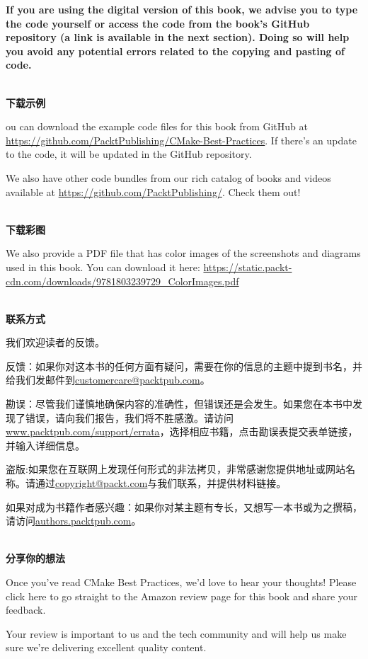 \textbf{If you are using the digital version of this book, we advise you to type the code yourself or access the code from the book's GitHub repository (a link is available in the next section). Doing so will help you avoid any potential errors related to the copying and pasting of code.}

\hspace*{\fill} \\ %
\textbf{下载示例}

ou can download the example code files for this book from GitHub at \url{https://github.com/PacktPublishing/CMake-Best-Practices}. If there's an update to the code, it will be updated in the GitHub repository.

We also have other code bundles from our rich catalog of books and videos available at \url{https://github.com/PacktPublishing/}. Check them out!

\hspace*{\fill} \\ %
\textbf{下载彩图}

We also provide a PDF file that has color images of the screenshots and diagrams used in this book. You can download it here: \url{https://static.packt-cdn.com/downloads/9781803239729_ColorImages.pdf}

\hspace*{\fill} \\ %
\textbf{联系方式}

我们欢迎读者的反馈。

反馈：如果你对这本书的任何方面有疑问，需要在你的信息的主题中提到书名，并给我们发邮件到\url{customercare@packtpub.com}。

勘误：尽管我们谨慎地确保内容的准确性，但错误还是会发生。如果您在本书中发现了错误，请向我们报告，我们将不胜感激。请访问\url{www.packtpub.com/support/errata}，选择相应书籍，点击勘误表提交表单链接，并输入详细信息。

盗版:如果您在互联网上发现任何形式的非法拷贝，非常感谢您提供地址或网站名称。请通过\url{copyright@packt.com}与我们联系，并提供材料链接。

如果对成为书籍作者感兴趣：如果你对某主题有专长，又想写一本书或为之撰稿，请访问\url{authors.packtpub.com}。

\hspace*{\fill} \\ %
\textbf{分享你的想法}

Once you've read CMake Best Practices, we'd love to hear your thoughts! Please click here to go straight to the Amazon review page for this book and share your feedback.

Your review is important to us and the tech community and will help us make sure we're delivering excellent quality content.

\newpage






















